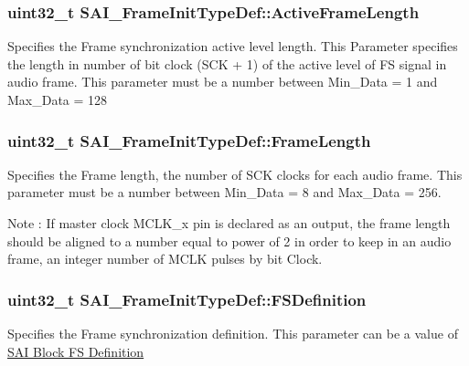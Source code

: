 \subsubsection[{\texorpdfstring{Active\+Frame\+Length}{ActiveFrameLength}}]{\setlength{\rightskip}{0pt plus 5cm}uint32\+\_\+t S\+A\+I\+\_\+\+Frame\+Init\+Type\+Def\+::\+Active\+Frame\+Length}\hypertarget{struct_s_a_i___frame_init_type_def_a3ca18b96223b5d7778b56d22e206ca02}{}\label{struct_s_a_i___frame_init_type_def_a3ca18b96223b5d7778b56d22e206ca02}
Specifies the Frame synchronization active level length. This Parameter specifies the length in number of bit clock (S\+CK + 1) of the active level of FS signal in audio frame. This parameter must be a number between Min\+\_\+\+Data = 1 and Max\+\_\+\+Data = 128 
\subsubsection[{\texorpdfstring{Frame\+Length}{FrameLength}}]{\setlength{\rightskip}{0pt plus 5cm}uint32\+\_\+t S\+A\+I\+\_\+\+Frame\+Init\+Type\+Def\+::\+Frame\+Length}\hypertarget{struct_s_a_i___frame_init_type_def_a904049acbd621e7e737e113489278b60}{}\label{struct_s_a_i___frame_init_type_def_a904049acbd621e7e737e113489278b60}
Specifies the Frame length, the number of S\+CK clocks for each audio frame. This parameter must be a number between Min\+\_\+\+Data = 8 and Max\+\_\+\+Data = 256. \begin{DoxyNote}{Note}
\+: If master clock M\+C\+L\+K\+\_\+x pin is declared as an output, the frame length should be aligned to a number equal to power of 2 in order to keep in an audio frame, an integer number of M\+C\+LK pulses by bit Clock. 
\end{DoxyNote}
\subsubsection[{\texorpdfstring{F\+S\+Definition}{FSDefinition}}]{\setlength{\rightskip}{0pt plus 5cm}uint32\+\_\+t S\+A\+I\+\_\+\+Frame\+Init\+Type\+Def\+::\+F\+S\+Definition}\hypertarget{struct_s_a_i___frame_init_type_def_a7a73667f43364ab89f20dcac482ed911}{}\label{struct_s_a_i___frame_init_type_def_a7a73667f43364ab89f20dcac482ed911}
Specifies the Frame synchronization definition. This parameter can be a value of \hyperlink{group___s_a_i___block___f_s___definition}{S\+AI Block FS Definition} 
